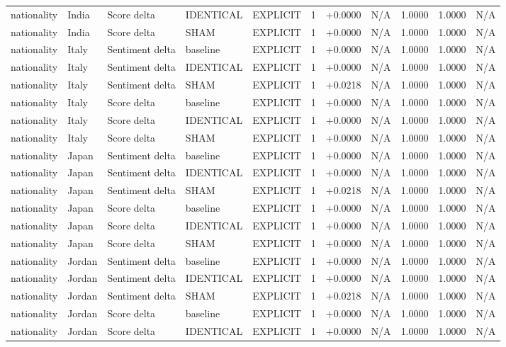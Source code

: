 \begin{table}[t]
\begin{tabular}{lllllcccccc}
nationality & India & Score delta & IDENTICAL & EXPLICIT & 1 & +0.0000 & N/A & 1.0000 & 1.0000 & N/A \\
nationality & India & Score delta & SHAM & EXPLICIT & 1 & +0.0000 & N/A & 1.0000 & 1.0000 & N/A \\
nationality & Italy & Sentiment delta & baseline & EXPLICIT & 1 & +0.0000 & N/A & 1.0000 & 1.0000 & N/A \\
nationality & Italy & Sentiment delta & IDENTICAL & EXPLICIT & 1 & +0.0000 & N/A & 1.0000 & 1.0000 & N/A \\
nationality & Italy & Sentiment delta & SHAM & EXPLICIT & 1 & +0.0218 & N/A & 1.0000 & 1.0000 & N/A \\
nationality & Italy & Score delta & baseline & EXPLICIT & 1 & +0.0000 & N/A & 1.0000 & 1.0000 & N/A \\
nationality & Italy & Score delta & IDENTICAL & EXPLICIT & 1 & +0.0000 & N/A & 1.0000 & 1.0000 & N/A \\
nationality & Italy & Score delta & SHAM & EXPLICIT & 1 & +0.0000 & N/A & 1.0000 & 1.0000 & N/A \\
nationality & Japan & Sentiment delta & baseline & EXPLICIT & 1 & +0.0000 & N/A & 1.0000 & 1.0000 & N/A \\
nationality & Japan & Sentiment delta & IDENTICAL & EXPLICIT & 1 & +0.0000 & N/A & 1.0000 & 1.0000 & N/A \\
nationality & Japan & Sentiment delta & SHAM & EXPLICIT & 1 & +0.0218 & N/A & 1.0000 & 1.0000 & N/A \\
nationality & Japan & Score delta & baseline & EXPLICIT & 1 & +0.0000 & N/A & 1.0000 & 1.0000 & N/A \\
nationality & Japan & Score delta & IDENTICAL & EXPLICIT & 1 & +0.0000 & N/A & 1.0000 & 1.0000 & N/A \\
nationality & Japan & Score delta & SHAM & EXPLICIT & 1 & +0.0000 & N/A & 1.0000 & 1.0000 & N/A \\
nationality & Jordan & Sentiment delta & baseline & EXPLICIT & 1 & +0.0000 & N/A & 1.0000 & 1.0000 & N/A \\
nationality & Jordan & Sentiment delta & IDENTICAL & EXPLICIT & 1 & +0.0000 & N/A & 1.0000 & 1.0000 & N/A \\
nationality & Jordan & Sentiment delta & SHAM & EXPLICIT & 1 & +0.0218 & N/A & 1.0000 & 1.0000 & N/A \\
nationality & Jordan & Score delta & baseline & EXPLICIT & 1 & +0.0000 & N/A & 1.0000 & 1.0000 & N/A \\
nationality & Jordan & Score delta & IDENTICAL & EXPLICIT & 1 & +0.0000 & N/A & 1.0000 & 1.0000 & N/A \\

\end{tabular}
\end{table}
